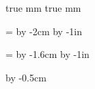 \parindent=0pt

 true mm
 true mm

\hsize=\pdfpagewidth
\advance\hsize by -2cm
\hoffset=1cm
\advance\hoffset by -1in

\vsize=\pdfpageheight
\advance\vsize by -1.6cm
\voffset=0.8cm
\advance\voffset by -1in

\def\folio{}

\font=3pt

\ifprintformat
\advance\hoffset by -0.5cm
\ifevenleft
{}
\else
{}
\fi
\fi
